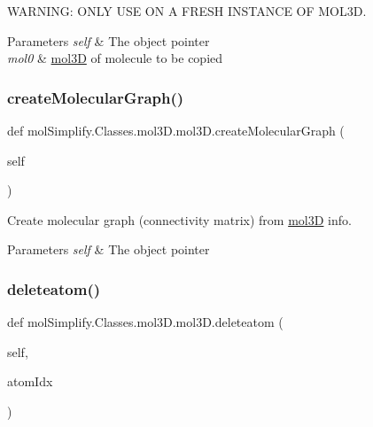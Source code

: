 W\+A\+R\+N\+I\+NG\+: O\+N\+LY U\+SE ON A F\+R\+E\+SH I\+N\+S\+T\+A\+N\+CE OF M\+O\+L3D. 
\begin{DoxyParams}{Parameters}
{\em self} & The object pointer \\
\hline
{\em mol0} & \hyperlink{classmolSimplify_1_1Classes_1_1mol3D_1_1mol3D}{mol3D} of molecule to be copied \\
\hline
\end{DoxyParams}
\mbox{\label{classmolSimplify_1_1Classes_1_1mol3D_1_1mol3D_afa77b09b79aeb68ed3b50b51987c61dc}} 
\subsubsection{\texorpdfstring{create\+Molecular\+Graph()}{createMolecularGraph()}}
{\footnotesize\ttfamily def mol\+Simplify.\+Classes.\+mol3\+D.\+mol3\+D.\+create\+Molecular\+Graph (\begin{DoxyParamCaption}\item[{}]{self }\end{DoxyParamCaption})}



Create molecular graph (connectivity matrix) from \hyperlink{classmolSimplify_1_1Classes_1_1mol3D_1_1mol3D}{mol3D} info. 


\begin{DoxyParams}{Parameters}
{\em self} & The object pointer \\
\hline
\end{DoxyParams}
\mbox{\label{classmolSimplify_1_1Classes_1_1mol3D_1_1mol3D_a6838664445a9896c703e0ffe2542ceef}} 
\subsubsection{\texorpdfstring{deleteatom()}{deleteatom()}}
{\footnotesize\ttfamily def mol\+Simplify.\+Classes.\+mol3\+D.\+mol3\+D.\+deleteatom (\begin{DoxyParamCaption}\item[{}]{self,  }\item[{}]{atom\+Idx }\end{DoxyParamCaption})}



